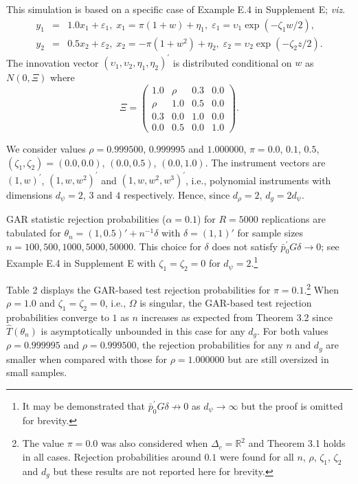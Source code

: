 \documentclass[hidelinks, 11 pt, a4paper, pdflatex]{article}
\begin{document}
{  This simulation is based on a specific case of Example E.4 in Supplement E; \textit{viz}.
   \begin{eqnarray*}
    y_{1} & = & 1.0 x_{1} + \varepsilon_{1}, \; x_1 = \pi(1+w) + \eta_1, \; \varepsilon_1 = \upsilon_1 \exp(-\zeta_1w/2), \\
	y_{2} & = & 0.5 x_2 + \varepsilon_{2}, \; x_2 = -\pi(1+w^2) + \eta_2, \; \varepsilon_2 = \upsilon_2 \exp(-\zeta_2 z/2).
   \end{eqnarray*}
  The innovation vector $(\upsilon_1,\upsilon_2,\eta_1,\eta_2)^{\prime}$ is distributed conditional on $w$ as $N(0,\Xi)$ where
   \begin{equation*}
    \Xi = \left(
           \begin{array}{cccc}
            1.0  & \rho & 0.3 & 0.0 \\
            \rho & 1.0 & 0.5 & 0.0 \\
            0.3  & 0.0 & 1.0 & 0.0 \\
            0.0  & 0.5 & 0.0 & 1.0
           \end{array}
          \right).
    \end{equation*}

  We consider values $\rho = 0.999500$, $0.999995$ and $1.000000$, $\pi = 0.0$, $0.1$, $0.5$, $(\zeta_1,\zeta_2) = (0.0,0.0)$, $(0.0,0.5)$, $(0.0,1.0)$. The instrument vectors are
  $(1,w)^{\prime}$, $(1,w,w^2)^{\prime}$ and $(1,w,w^2,w^3)^{\prime}$, i.e., polynomial instruments with dimensions $d_{\psi} = 2$, $3$ and $4$ respectively. Hence, since $d_\rho = 2$, $d_g = 2d_{\psi}$.
		
  GAR statistic rejection probabilities ($\alpha=0.1$) for $R = 5000$ replications are tabulated for $\theta_n =(1,0.5)' + n^{-1}\delta$ with $\delta = (1,1)'$ for sample sizes $n = 100, 500, 1000, 5000, 50000$. This choice for $\delta$ does not satisfy $\bar{p}_{0}^{\prime}G\delta \rightarrow 0$; see Example E.4 in Supplement E with $\zeta_1 = \zeta_2 = 0$ for $d_{\psi} = 2$.\footnote{It may be demonstrated that $\bar{p}_{0}^{\prime}G\delta \nrightarrow 0$ as $d_{\psi} \rightarrow \infty$ but the proof is omitted for brevity.}		
			
  Table 2 displays the GAR-based test rejection probabilities for $\pi = 0.1$.\footnote{The value $\pi = 0.0$ was also considered when $\Delta_c = \mathbb{R}^2$ and Theorem 3.1 holds in all cases. Rejection probabilities around $0.1$ were found for all $n$, $\rho$, $\zeta_1$, $\zeta_2$ and $d_g$ but these results are not reported here for brevity.} When $\rho = 1.0$ and $\zeta_1 = \zeta_2 = 0$, i.e., $\Omega$ is  singular, the GAR-based test rejection probabilities converge to $1$ as $n$ increases as expected from Theorem 3.2 since $\hat{T}(\theta_n)$ is asymptotically  unbounded in this case for any $d_g$. For both values $\rho = 0.999995$ and $\rho = 0.999500$, the rejection probabilities for any $n$ and $d_g$ are smaller when compared with those for $\rho = 1.000000$ but are still oversized in small samples.
		
}
\end{document}
